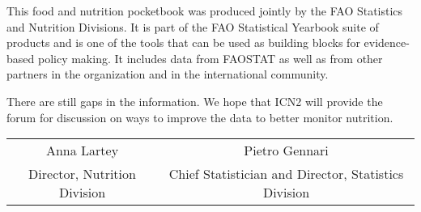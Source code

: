 This food and nutrition pocketbook was produced jointly by the FAO Statistics and Nutrition Divisions. It is part of the FAO Statistical Yearbook suite of products and is one of the tools that can be used as building blocks for evidence-based policy making. It includes data from FAOSTAT as well as from other partners in the organization and in the international community. 

There are still gaps in the information. We hope that ICN2 will  provide the  forum for discussion on ways to improve the data to better monitor nutrition.

\bigskip

\begin{table}
\centering
\begin{tabular}{cc}
Anna Lartey & Pietro Gennari  \\
Director, Nutrition Division & Chief Statistician and Director, Statistics Division
\end{tabular}
\end{table}

